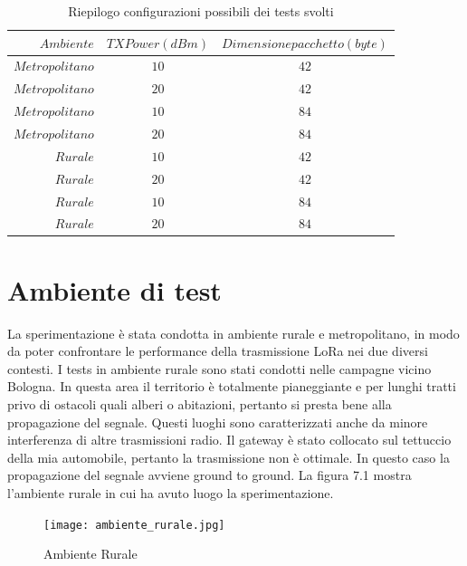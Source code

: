 \documentclass[12pt,a4paper,openright,twoside]{report}
\begin{document}
\begin{table}[h]                        
\begin{center}                          
\begin{tabular}{r|c|c}                  
                                                   
$Ambiente$ & $TX Power (dBm)$ & $Dimensione pacchetto (byte)$\\         
\hline\hline                                  
$Metropolitano$ & $10$ & $42$\\     
\hline                               
$Metropolitano$ & $20$ & $42$\\
\hline        
$Metropolitano$ & $10$ & $84$\\ 
\hline 
$Metropolitano$ & $20$ & $84$\\ 
\hline 
$Rurale$ & $10$ & $42$\\     
\hline                               
$Rurale$ & $20$ & $42$\\
\hline        
$Rurale$ & $10$ & $84$\\ 
\hline 
$Rurale$ & $20$ & $84$\\ 
\hline \hline                         
\end{tabular}
\caption[Riepilogo configurazioni possibili dei tests svolti]{Riepilogo configurazioni possibili dei tests svolti}\label{tab:uno}
\end{center}
\end{table}

\section{Ambiente di test}
La sperimentazione \`e stata condotta in ambiente rurale e metropolitano, in modo da poter confrontare le performance della trasmissione LoRa nei due diversi contesti. 
I tests in ambiente rurale sono stati condotti nelle campagne vicino Bologna. In questa area il territorio \`e totalmente pianeggiante e per lunghi tratti privo di ostacoli quali alberi o abitazioni, pertanto si presta bene alla propagazione del segnale. Questi luoghi sono caratterizzati anche da minore interferenza di altre trasmissioni radio. Il gateway \`e stato collocato sul tettuccio della mia automobile, pertanto la trasmissione non \`e ottimale. In questo caso la propagazione del segnale avviene ground to ground. 
La figura 7.1 mostra l'ambiente rurale in cui ha avuto luogo la sperimentazione.
\begin{figure}[h]                      
\begin{center} 
\texttt{[image: ambiente\_rurale.jpg]}
\caption[Ambiente Rurale]{Ambiente Rurale}\label{fig:prima}
\end{center}
\end{figure}
\end{document}
